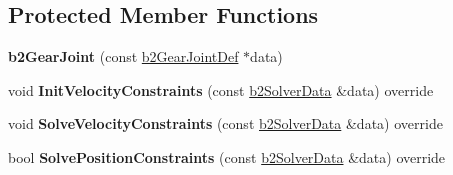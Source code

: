 \subsection*{Protected Member Functions}
\begin{DoxyCompactItemize}
\item 
\mbox{\label{classb2_gear_joint_a4b247c79e74cb1e5b906527fe7d151ce}} 
{\bfseries b2\+Gear\+Joint} (const \hyperlink{structb2_gear_joint_def}{b2\+Gear\+Joint\+Def} $\ast$data)
\item 
\mbox{\label{classb2_gear_joint_ac3c76db6940bcb4c94d564960b9c57ab}} 
void {\bfseries Init\+Velocity\+Constraints} (const \hyperlink{structb2_solver_data}{b2\+Solver\+Data} \&data) override
\item 
\mbox{\label{classb2_gear_joint_a25ff465354108f5ae2b60fb9f7836820}} 
void {\bfseries Solve\+Velocity\+Constraints} (const \hyperlink{structb2_solver_data}{b2\+Solver\+Data} \&data) override
\item 
\mbox{\label{classb2_gear_joint_a85633bbab3c4b4cb862bccce7e0253c2}} 
bool {\bfseries Solve\+Position\+Constraints} (const \hyperlink{structb2_solver_data}{b2\+Solver\+Data} \&data) override
\end{DoxyCompactItemize}
